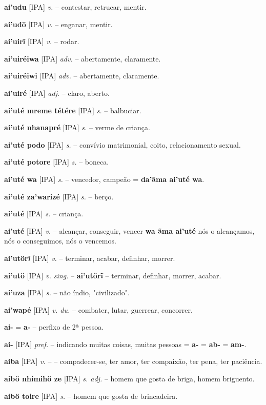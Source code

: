 \textbf{ai'udu} [IPA] \textit{v.} -- contestar, retrucar, mentir.

\textbf{ai'udö} [IPA] \textit{v.} -- enganar, mentir.

\textbf{ai'uirĩ} [IPA] \textit{v.} -- rodar.

\textbf{ai'uiréiwa} [IPA] \textit{adv.} -- abertamente, claramente.

\textbf{ai'uiréiwi} [IPA] \textit{adv.} -- abertamente, claramente.

\textbf{ai'uiré} [IPA] \textit{adj.} -- claro, aberto.

\textbf{ai'uté mreme tétére} [IPA] \textit{s.} -- balbuciar.

\textbf{ai'uté nhanapré} [IPA] \textit{s.} -- verme de criança.

\textbf{ai'uté podo} [IPA] \textit{s.} -- convívio matrimonial, coito, relacionamento sexual.

\textbf{ai'uté potore} [IPA] \textit{s.} -- boneca.

\textbf{ai'uté wa} [IPA] \textit{s.} -- vencedor, campeão = \textbf{da'ãma ai'uté wa}.

\textbf{ai'uté za'warizé} [IPA] \textit{s.} -- berço.

\textbf{ai'uté} [IPA] \textit{s.} -- criança.

\textbf{ai'uté} [IPA] \textit{v.} -- alcançar, conseguir, vencer  \textbf{wa ãma ai'uté} nós o alcançamos, nós o conseguimos, nós o vencemos.

\textbf{ai'utörĩ} [IPA] \textit{v.} -- terminar, acabar, definhar, morrer.

\textbf{ai'utö} [IPA] \textit{v. sing.} -- \textbf{ai'utörĩ} -- terminar, definhar, morrer, acabar.

\textbf{ai'uza} [IPA] \textit{s.} -- não índio, "civilizado".

\textbf{ai'wapé} [IPA] \textit{v. du.} -- combater, lutar, guerrear, concorrer.

\textbf{ai-} = \textbf{a-} -- perfixo de 2ª pessoa.

\textbf{ai-} [IPA] \textit{pref.} -- indicando muitas coisas, muitas pessoas  = \textbf{a-} = \textbf{ab-} = \textbf{am-}.

\textbf{aiba} [IPA] \textit{v.} -- -- compadecer-se, ter amor, ter compaixão, ter pena, ter paciência.

\textbf{aibö nhimihö ze} [IPA] \textit{s. adj.} -- homem que gosta de briga, homem briguento.

\textbf{aibö toire} [IPA] \textit{s.} -- homem que gosta de brincadeira.

